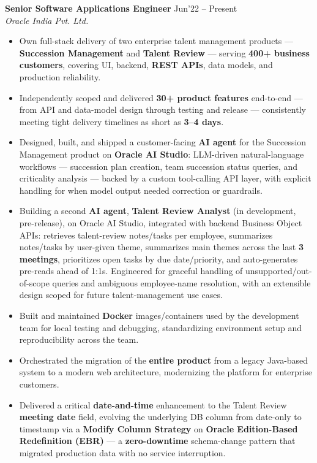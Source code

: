 \documentclass[10pt,a4paper]{article}
\newcommand{\resumeItem}[1]{\item[\textcolor{primary}{\textbullet}] #1}
\begin{document}
\textbf{Senior Software Applications Engineer} \hfill Jun'22 -- Present\\
\textit{Oracle India Pvt. Ltd.}
\begin{itemize}[leftmargin=1.05em, nosep, topsep=2pt, itemsep=2pt, parsep=0pt]
    \resumeItem{Own full-stack delivery of two enterprise talent management products --- \textbf{Succession Management} and \textbf{Talent Review} --- serving \textbf{400+ business customers}, covering UI, backend, \textbf{REST APIs}, data models, and production reliability.}
    \resumeItem{Independently scoped and delivered \textbf{30+ product features} end-to-end --- from API and data-model design through testing and release --- consistently meeting tight delivery timelines as short as \textbf{3--4 days}.}
    \resumeItem{Designed, built, and shipped a customer-facing \textbf{AI agent} for the Succession Management product on \textbf{Oracle AI Studio}: LLM-driven natural-language workflows --- succession plan creation, team succession status queries, and criticality analysis --- backed by a custom tool-calling API layer, with explicit handling for when model output needed correction or guardrails.}
    \resumeItem{Building a second \textbf{AI agent}, \textbf{Talent Review Analyst} (in development, pre-release), on Oracle AI Studio, integrated with backend Business Object APIs: retrieves talent-review notes/tasks per employee, summarizes notes/tasks by user-given theme, summarizes main themes across the last \textbf{3 meetings}, prioritizes open tasks by due date/priority, and auto-generates pre-reads ahead of 1:1s. Engineered for graceful handling of unsupported/out-of-scope queries and ambiguous employee-name resolution, with an extensible design scoped for future talent-management use cases.}
    \resumeItem{Built and maintained \textbf{Docker} images/containers used by the development team for local testing and debugging, standardizing environment setup and reproducibility across the team.}
    \resumeItem{Orchestrated the migration of the \textbf{entire product} from a legacy Java-based system to a modern web architecture, modernizing the platform for enterprise customers.}
    \resumeItem{Delivered a critical \textbf{date-and-time} enhancement to the Talent Review \textbf{meeting date} field, evolving the underlying DB column from date-only to timestamp via a \textbf{Modify Column Strategy} on \textbf{Oracle Edition-Based Redefinition (EBR)} --- a \textbf{zero-downtime} schema-change pattern that migrated production data with no service interruption.}
\end{itemize}
\end{document}
